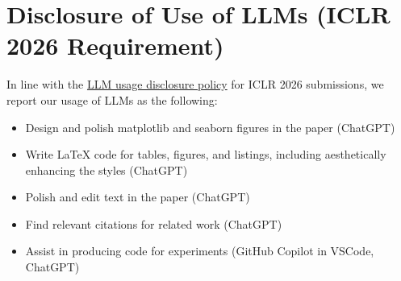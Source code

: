 \newpage
\section{Disclosure of Use of LLMs (ICLR 2026 Requirement)}
In line with the \href{https://blog.iclr.cc/2025/08/26/policies-on-large-language-model-usage-at-iclr-2026/}{LLM usage disclosure policy} for ICLR 2026 submissions, we report our usage of LLMs as the following:
\begin{itemize}
    \item Design and polish matplotlib and seaborn figures in the paper (ChatGPT)
    \item Write LaTeX code for tables, figures, and listings, including aesthetically enhancing the styles (ChatGPT)
    \item Polish and edit text in the paper (ChatGPT)
    \item Find relevant citations for related work (ChatGPT)
    \item Assist in producing code for experiments (GitHub Copilot in VSCode, ChatGPT)
\end{itemize}